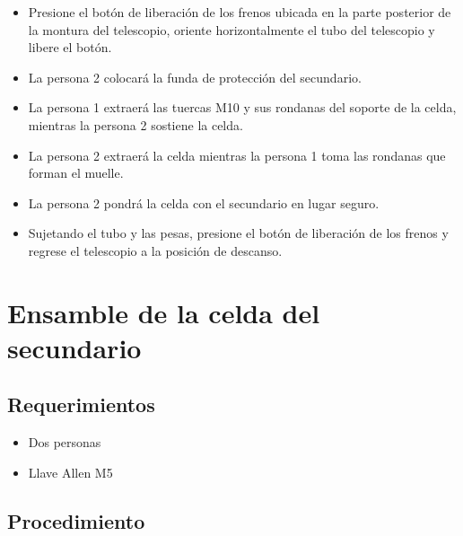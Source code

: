 \begin{itemize}
\item Presione el botón de liberación de los frenos ubicada en la parte posterior de la montura del telescopio, oriente horizontalmente el tubo del telescopio y libere el botón. 
\item La persona 2 colocará la funda de protección del secundario.
\item La persona 1 extraerá las tuercas M10 y sus rondanas del soporte de la celda, mientras la persona 2 sostiene la celda.
\item La persona 2 extraerá la celda mientras la persona 1 toma las rondanas que forman el muelle.
\item La persona 2 pondrá la celda con el secundario en lugar seguro.
\item Sujetando el tubo y las pesas, presione el botón de liberación de los frenos y regrese el telescopio a la posición de descanso. 
\end{itemize}

\section{Ensamble de la celda del secundario}

\subsection{Requerimientos}

\begin{itemize}
\item Dos personas
\item Llave Allen M5
\end{itemize}

\subsection{Procedimiento}

